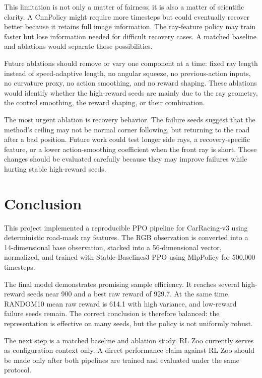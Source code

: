 \documentclass[conference]{IEEEtran}
\begin{document}
This limitation is not only a matter of fairness; it is also a matter of scientific clarity. A CnnPolicy might require more timesteps but could eventually recover better because it retains full image information. The ray-feature policy may train faster but lose information needed for difficult recovery cases. A matched baseline and ablations would separate those possibilities.

Future ablations should remove or vary one component at a time: fixed ray length instead of speed-adaptive length, no angular squeeze, no previous-action inputs, no curvature proxy, no action smoothing, and no reward shaping. These ablations would identify whether the high-reward seeds are mainly due to the ray geometry, the control smoothing, the reward shaping, or their combination.

The most urgent ablation is recovery behavior. The failure seeds suggest that the method's ceiling may not be normal corner following, but returning to the road after a bad position. Future work could test longer side rays, a recovery-specific feature, or a lower action-smoothing coefficient when the front ray is short. Those changes should be evaluated carefully because they may improve failures while hurting stable high-reward seeds.

\section{Conclusion}

This project implemented a reproducible PPO pipeline for CarRacing-v3 using deterministic road-mask ray features. The RGB observation is converted into a 14-dimensional base observation, stacked into a 56-dimensional vector, normalized, and trained with Stable-Baselines3 PPO using MlpPolicy for 500,000 timesteps.

The final model demonstrates promising sample efficiency. It reaches several high-reward seeds near 900 and a best raw reward of 929.7. At the same time, RANDOM10 mean raw reward is 614.1 with high variance, and low-reward failure seeds remain. The correct conclusion is therefore balanced: the representation is effective on many seeds, but the policy is not uniformly robust.

The next step is a matched baseline and ablation study. RL Zoo currently serves as configuration context only. A direct performance claim against RL Zoo should be made only after both pipelines are trained and evaluated under the same protocol.
\end{document}
